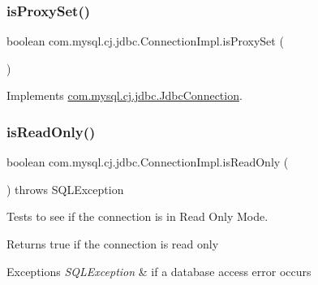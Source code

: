 \subsubsection{\texorpdfstring{is\+Proxy\+Set()}{isProxySet()}}
{\footnotesize\ttfamily boolean com.\+mysql.\+cj.\+jdbc.\+Connection\+Impl.\+is\+Proxy\+Set (\begin{DoxyParamCaption}{ }\end{DoxyParamCaption})}



Implements \mbox{\hyperlink{interfacecom_1_1mysql_1_1cj_1_1jdbc_1_1_jdbc_connection_abf3c640bcdbc0839cd67ed0e9b7d94a1}{com.\+mysql.\+cj.\+jdbc.\+Jdbc\+Connection}}.

\mbox{\label{classcom_1_1mysql_1_1cj_1_1jdbc_1_1_connection_impl_a1bd9587a13c01e6f58570c837024cf2d}} 
\subsubsection{\texorpdfstring{is\+Read\+Only()}{isReadOnly()}\hspace{0.1cm}{\footnotesize\ttfamily [1/2]}}
{\footnotesize\ttfamily boolean com.\+mysql.\+cj.\+jdbc.\+Connection\+Impl.\+is\+Read\+Only (\begin{DoxyParamCaption}{ }\end{DoxyParamCaption}) throws S\+Q\+L\+Exception}

Tests to see if the connection is in Read Only Mode.

\begin{DoxyReturn}{Returns}
true if the connection is read only 
\end{DoxyReturn}

\begin{DoxyExceptions}{Exceptions}
{\em S\+Q\+L\+Exception} & if a database access error occurs \\
\hline
\end{DoxyExceptions}
\mbox{\label{classcom_1_1mysql_1_1cj_1_1jdbc_1_1_connection_impl_ab81709d56fbf320b82e513a770342a90}} 
